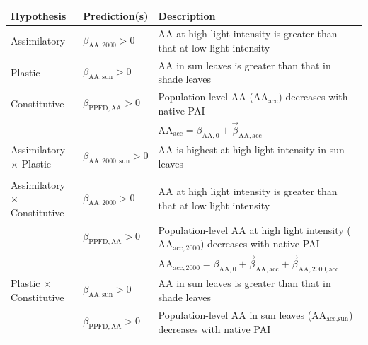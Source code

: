 \documentclass[
  letterpaper,
  DIV=11,
  numbers=noendperiod]{scrartcl}
\newcommand{\aax}{$\mathrm{AA}$}
\begin{document}
\begin{longtable}{>{\raggedright\arraybackslash}p{1in}>{\raggedright\arraybackslash}p{1.5in}>{\raggedright\arraybackslash}p{3in}}
\toprule
\textbf{Hypothesis} & \textbf{Prediction(s)} & \textbf{Description}\\
\midrule
Assimilatory & $\beta_{\mathrm{AA},2000} > 0$ & \hspace{-1em}\aax{} at high light intensity is greater than that at low light intensity\\
\cmidrule{1-3}\pagebreak[0]
Plastic & $\beta_{\mathrm{AA},\text{sun}} > 0$ & \hspace{-1em}\aax{} in sun leaves is greater than that in shade leaves\\
\cmidrule{1-3}\pagebreak[0]
Constitutive & $\beta_{\mathrm{PPFD,AA}} > 0$ & \hspace{-1em}Population-level \aax{} ($\mathrm{AA}_\text{acc}$) decreases with native PAI\\
\nopagebreak
 &  & \hspace{-1em}$\mathrm{AA}_\text{acc} = \beta_{\mathrm{AA}, 0} + \vec{\beta}_{\mathrm{AA}, \text{acc}}$\\
\cmidrule{1-3}\pagebreak[0]
Assimilatory $\times$ Plastic & $\beta_{\mathrm{AA},2000,\text{sun}} > 0$ & \hspace{-1em}\aax{} is highest at high light intensity in sun leaves\\
\nopagebreak
 &  & \hspace{-1em}\\
\cmidrule{1-3}\pagebreak[0]
Assimilatory $\times$ Constitutive & $\beta_{\mathrm{AA},2000} > 0$ & \hspace{-1em}\aax{} at high light intensity is greater than that at low light intensity\\
\nopagebreak
 & $\beta_{\mathrm{PPFD,AA}} > 0$ & \hspace{-1em}Population-level \aax{} at high light intensity ($\mathrm{AA}_{\text{acc},2000}$) decreases with native PAI\\
\nopagebreak
 &  & \hspace{-1em}$\mathrm{AA}_{\text{acc},2000} = \beta_{\mathrm{AA}, 0} + \vec{\beta}_{\mathrm{AA}, \text{acc}} + \vec{\beta}_{\mathrm{AA}, 2000, \text{acc}}$\\
\cmidrule{1-3}\pagebreak[0]
Plastic $\times$ Constitutive & $\beta_{\mathrm{AA},\text{sun}} > 0$ & \hspace{-1em}\aax{} in sun leaves is greater than that in shade leaves\\
\nopagebreak
 & $\beta_{\mathrm{PPFD,AA}} > 0$ & \hspace{-1em}Population-level \aax{} in sun leaves ($\mathrm{AA}_{\text{acc},\text{sun}}$) decreases with native PAI\\

\end{longtable}
\end{document}
